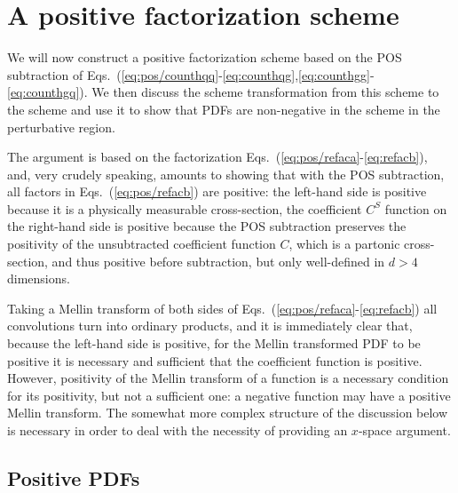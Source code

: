 
\section{A positive factorization scheme}
\label{sec:pos/scheme}

We will now construct a positive factorization scheme based on the POS 
subtraction of
Eqs.~(\ref{eq:pos/counthqq}-\ref{eq:counthqg},\ref{eq:counthgg}-\ref{eq:counthgq}).
We then discuss the scheme transformation from this scheme to the
\msbar{} scheme and use it to show that PDFs are non-negative in the
\msbar{} scheme in the perturbative region.

The argument is based on the factorization
Eqs.~(\ref{eq:pos/refaca}-\ref{eq:refacb}), and, very crudely speaking, amounts to
showing that with the POS subtraction, all factors in Eqs.~(\ref{eq:pos/refacb})
are positive: the left-hand side is positive because it is a physically
measurable cross-section, the coefficient $C^S$ function on the right-hand side
is positive because the POS subtraction preserves the positivity of the
unsubtracted coefficient function $C$, which is a partonic cross-section, and
thus positive before subtraction, but only well-defined in $d>4$ dimensions.

Taking a Mellin transform of both sides of
Eqs.~(\ref{eq:pos/refaca}-\ref{eq:refacb}) all convolutions turn into
ordinary products, and it is immediately clear that, because the left-hand
side is positive, for the
Mellin transformed PDF to be positive it is necessary and sufficient
that the coefficient  function is positive. However, 
positivity of the Mellin transform of a function is a necessary
condition for its positivity, but not a sufficient one: a negative
function may have a positive Mellin transform. The somewhat more
complex structure of the discussion below is necessary in order
to deal with the necessity of providing an $x$-space argument.


\subsection{Positive PDFs}
\label{sec:pospdf}

